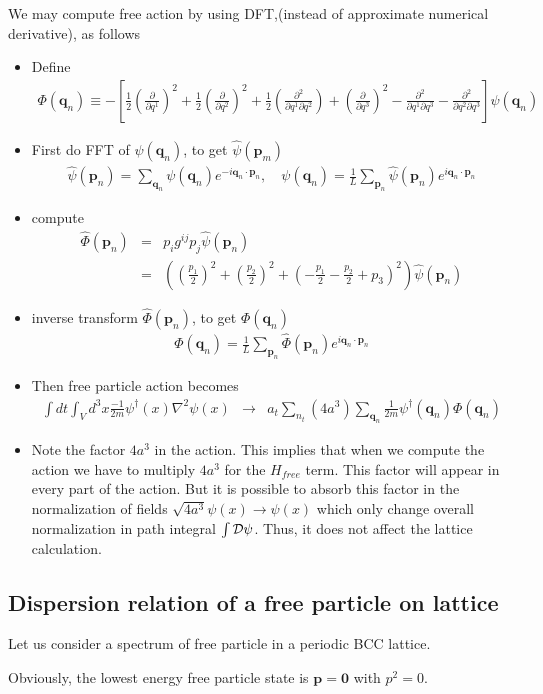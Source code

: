 \documentclass[10pt]{book}
\def\bm{\boldsymbol}
\newcommand{\bea}{\begin{eqnarray}}
\newcommand{\eea}{\end{eqnarray}}
\newcommand{\no}{\nonumber \\}
\newcommand{\del}{\partial}
\begin{document}
We may compute free action by using DFT,(instead of approximate numerical derivative), as follows
\begin{itemize}
	\item Define 
	\bea 
	\Phi({\bm q}_n)\equiv -\left[ \frac{1}{2}(\frac{\del}{\del q^1})^2+\frac{1}{2}(\frac{\del}{\del q^2})^2
	+ \frac{1}{2}(\frac{\del^2}{\del q^1 \del q^2})
	+(\frac{\del}{\del q^3})^2-\frac{\del^2}{\del q^1 \del q^3}  
	-\frac{\del^2}{\del q^2 \del q^3}
	\right]\psi({\bm q}_n)
	\eea 
	\item First do FFT of $\psi({\bm q}_n)$, to get $\hat{\psi}({\bm p_m})$
	\bea 
	   \hat{\psi}({\bm p_n})= \sum_{{\bm q}_n} {\psi}({\bm q_n}) e^{-i {\bm q}_n\cdot {\bm p}_n },\quad 
	   \psi({\bm q}_n)=\frac{1}{L}\sum_{{\bm p}_n} \hat{\psi}({\bm p_n}) e^{i {\bm q}_n\cdot {\bm p}_n }
	\eea 
	\item compute 
	\bea 
	 \hat{\Phi}({\bm p}_n) &=& p_i g^{ij} p_j \hat{\psi}({\bm p}_n) \no 
	   &=&\left( (\frac{p_1}{2})^2+(\frac{p_2}{2})^2+(-\frac{p_1}{2}-\frac{p_2}{2}+p_3)^2 \right)\hat{\psi}({\bm p}_n) 
	\eea 
	\item inverse transform $\hat{\Phi}({\bm p}_n)$, to get $\Phi({\bm q}_n)$
	\bea 
	 \Phi({\bm q}_n)=\frac{1}{L}\sum_{{\bm p}_n} \hat{\Phi}({\bm p_n}) e^{i {\bm q}_n\cdot {\bm p}_n }
	\eea
	\item Then free particle action becomes
	\bea 
    \int dt \int_V d^3 x \frac{-1}{2m}\psi^\dagger(x)\nabla^2\psi(x)  
	&\to& a_t \sum_{n_t} (4a^3) \sum_{{\bm q}_n} 
	\frac{1}{2m} \psi^\dagger({\bm q}_n)\Phi({\bm q}_n)
	\eea  
	\item Note the factor $4a^3$ in the action. This implies that when we compute the action we have to multiply $4a^3$ for the $H_{free}$ term. This factor will appear in every part of the action. But it is possible to absorb this factor in the normalization
	of fields $\sqrt{4a^3}\psi(x)\to \psi(x)$ which only change overall normalization in path integral $\int{\cal D}\psi$. Thus, it does not affect the lattice calculation.  
\end{itemize}	

\subsection{Dispersion relation of a free particle on lattice}\label{sec:dispersion} 
Let us consider a spectrum of free particle in a periodic BCC lattice.

Obviously, the lowest energy free particle state is  ${\bm p}={\bm 0}$ with $p^2=0$.
\end{document}
